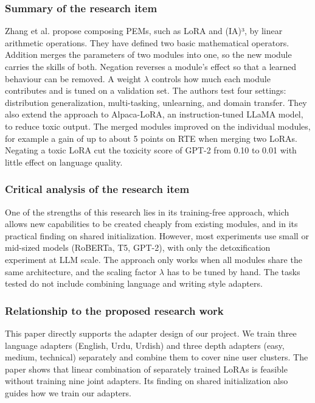 \documentclass{FastFyp}
\begin{document}
 \subsubsection{Summary of the research item}
 Zhang et al. \cite{zhang2023composing} propose composing PEMs, such as LoRA and (IA)³, by linear arithmetic operations. They have defined two basic mathematical operators. Addition merges the parameters of two modules into one, so the new module carries the skills of both. Negation reverses a module's effect so that a learned behaviour can be removed. A weight $\lambda$ controls how much each module contributes and is tuned on a validation set. The authors test four settings: distribution generalization, multi-tasking, unlearning, and domain transfer. They also extend the approach to Alpaca-LoRA, an instruction-tuned LLaMA model, to reduce toxic output. The merged modules improved on the individual modules, for example a gain of up to about 5 points on RTE when merging two LoRAs. Negating a toxic LoRA cut the toxicity score of GPT-2 from 0.10 to 0.01 with little effect on language quality.

\subsubsection{Critical analysis of the research item}
One of the strengths of this research lies in its training-free approach, which allows new capabilities to be created cheaply from existing modules, and in its practical finding on shared initialization. However, most experiments use small or mid-sized models (RoBERTa, T5, GPT-2), with only the detoxification experiment at LLM scale. The approach only works when all modules share the same architecture, and the scaling factor $\lambda$ has to be tuned by hand. The tasks tested do not include combining language and writing style adapters.

\subsubsection{Relationship to the proposed research work}
This paper directly supports the adapter design of our project. We train three language adapters (English, Urdu, Urdish) and three depth adapters (easy, medium, technical) separately and combine them to cover nine user clusters. The paper shows that linear combination of separately trained LoRAs is feasible without training nine joint adapters. Its finding on shared initialization also guides how we train our adapters.
\end{document}
